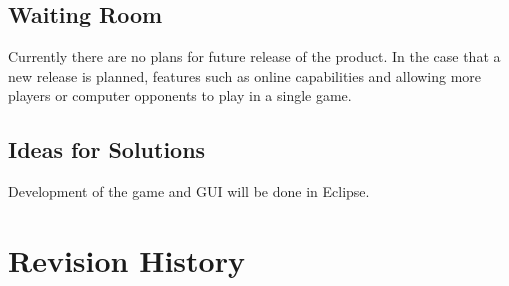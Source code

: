 \documentclass[12pt]{article}
\begin{document}
	\subsection{Waiting Room}
	Currently there are no plans for future release of the product. In the case that a new 		release is planned, features such as online capabilities and allowing more players or 		computer opponents to play in a single game. 
	\subsection{Ideas for Solutions}
	Development of the game and GUI will be done in Eclipse.
	\section{Revision History}
\end{document}
